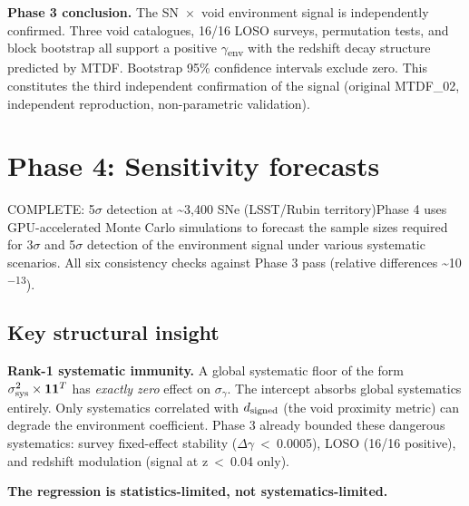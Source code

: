 \documentclass[11pt,a4paper]{article}
\begin{document}
\begin{mdframed}[linecolor=accent,linewidth=0.5pt,backgroundcolor=callout-bg,leftline=true,rightline=true,topline=true,bottomline=true,innerleftmargin=8pt,innerrightmargin=8pt,innertopmargin=6pt,innerbottommargin=6pt]
\textbf{Phase 3 conclusion.}
The SN~$\times$~void environment signal is independently confirmed. Three void catalogues, 16/\allowbreak{}16 LOSO surveys, permutation tests, and block bootstrap all support a positive $\gamma$\textsubscript{env} with the redshift decay structure predicted by MTDF. Bootstrap 95\% confidence intervals exclude zero. This constitutes the third independent confirmation of the signal (original MTDF\_\allowbreak{}02, independent reproduction, non-parametric validation).
\end{mdframed}

\section{Phase 4: Sensitivity forecasts}
\label{sec:sec5}
COMPLETE: 5$\sigma$ detection at \~{}3,400 SNe (LSST/\allowbreak{}Rubin territory)Phase 4 uses GPU-accelerated Monte Carlo simulations to forecast the sample sizes required for 3$\sigma$ and 5$\sigma$ detection of the environment signal under various systematic scenarios. All six consistency checks against Phase 3 pass (relative differences \~{}10\textsuperscript{$-$13}).

\subsection{Key structural insight}
\begin{mdframed}[linecolor=accent,linewidth=0.5pt,backgroundcolor=callout-bg,leftline=true,rightline=true,topline=true,bottomline=true,innerleftmargin=8pt,innerrightmargin=8pt,innertopmargin=6pt,innerbottommargin=6pt]
\textbf{Rank-1 systematic immunity.}
A global systematic floor of the form \( \sigma_{\rm sys}^2 \times \mathbf{1}\mathbf{1}^T \) has \emph{exactly zero} effect on \( \sigma_{\gamma} \). The intercept absorbs global systematics entirely. Only systematics correlated with \( d_{\rm signed} \) (the void proximity metric) can degrade the environment coefficient. Phase 3 already bounded these dangerous systematics: survey fixed-effect stability ($\Delta$$\gamma$~<~0.0005), LOSO (16/\allowbreak{}16 positive), and redshift modulation (signal at z~<~0.04 only).
\end{mdframed}

\textbf{The regression is statistics-limited, not systematics-limited.}
\end{document}

